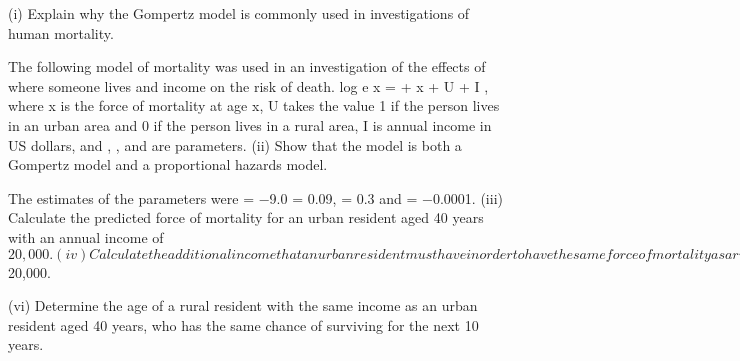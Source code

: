 (i) Explain why the Gompertz model is commonly used in investigations of
human mortality.


The following model of mortality was used in an investigation of the effects of where
someone lives and income on the risk of death.
log e \mu x = \alpha +  x +  U +  I ,
where \mu x is the force of mortality at age x, U takes the value 1 if the person lives in an
urban area and 0 if the person lives in a rural area, I is annual income in US dollars,
and \alpha,  ,  and  are parameters.
(ii)
Show that the model is both a Gompertz model and a proportional hazards
model.

The estimates of the parameters were \alpha = −9.0  = 0.09,  = 0.3 and  = −0.0001.
(iii) Calculate the predicted force of mortality for an urban resident aged 40 years
with an annual income of $20,000.

(iv) Calculate the additional income that an urban resident must have in order to
have the same force of mortality as a rural resident of the same age.

CT4 S2013–48
(v) Calculate the 10-year survival probability for an urban resident aged 40 years
whose annual income is $20,000.

(vi) Determine the age of a rural resident with the same income as an urban
resident aged 40 years, who has the same chance of surviving for the next 10
years.



